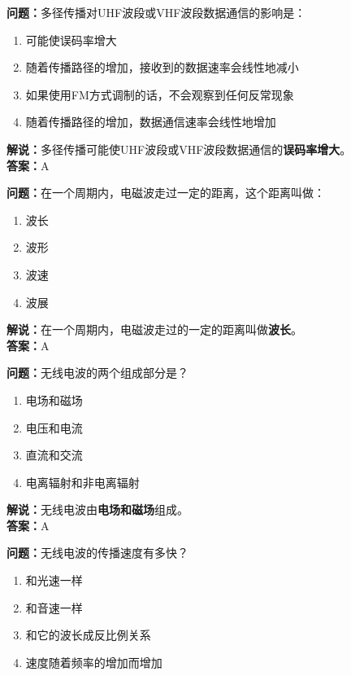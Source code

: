 \textbf{问题：}多径传播对UHF波段或VHF波段数据通信的影响是：

\begin{enumerate}[label=\Alph*), leftmargin=1cm]
	\item 可能使误码率增大
	\item 随着传播路径的增加，接收到的数据速率会线性地减小
	\item 如果使用FM方式调制的话，不会观察到任何反常现象
	\item 随着传播路径的增加，数据通信速率会线性地增加
\end{enumerate}

\textbf{解说：}多径传播可能使UHF波段或VHF波段数据通信的\textbf{误码率增大}。\\\textbf{答案：}A%



\textbf{问题：}在一个周期内，电磁波走过一定的距离，这个距离叫做：

\begin{enumerate}[label=\Alph*), leftmargin=1cm]
	\item 波长
	\item 波形
	\item 波速
	\item 波展
\end{enumerate}

\textbf{解说：}在一个周期内，电磁波走过的一定的距离叫做\textbf{波长}。\\\textbf{答案：}A%



\textbf{问题：}无线电波的两个组成部分是？

\begin{enumerate}[label=\Alph*), leftmargin=1cm]
	\item 电场和磁场
	\item 电压和电流
	\item 直流和交流
	\item 电离辐射和非电离辐射
\end{enumerate}

\textbf{解说：}无线电波由\textbf{电场和磁场}组成。\\\textbf{答案：}A%



\textbf{问题：}无线电波的传播速度有多快？

\begin{enumerate}[label=\Alph*), leftmargin=1cm]
	\item 和光速一样
	\item 和音速一样
	\item 和它的波长成反比例关系
	\item 速度随着频率的增加而增加
\end{enumerate}

